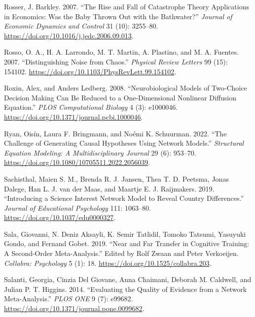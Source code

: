 \documentclass[
  a4paper,
  DIV=11,
  numbers=noendperiod]{scrreprt}
\newlength{\cslhangindent}
\newlength{\cslentryspacingunit} %
\newenvironment{CSLReferences}[2] %
 {%
  \setlength{\parindent}{0pt}
  \ifodd #1
  \let\oldpar\par
  \def\par{\hangindent=\cslhangindent\oldpar}
  \fi
  \setlength{\parskip}{#2\cslentryspacingunit}
 }%
 {}
\begin{document}
\begin{CSLReferences}{1}{0}
\leavevmode{}%
Rosser, J. Barkley. 2007. {``The Rise and Fall of Catastrophe Theory
Applications in Economics: {Was} the Baby Thrown Out with the
Bathwater?''} \emph{Journal of Economic Dynamics and Control} 31 (10):
3255--80. \url{https://doi.org/10.1016/j.jedc.2006.09.013}.

\leavevmode{}%
Rosso, O. A., H. A. Larrondo, M. T. Martin, A. Plastino, and M. A.
Fuentes. 2007. {``Distinguishing Noise from Chaos.''} \emph{Physical
Review Letters} 99 (15): 154102.
\url{https://doi.org/10.1103/PhysRevLett.99.154102}.

\leavevmode{}%
Roxin, Alex, and Anders Ledberg. 2008. {``Neurobiological {Models} of
{Two-Choice Decision Making Can Be Reduced} to a {One-Dimensional
Nonlinear Diffusion Equation}.''} \emph{PLOS Computational Biology} 4
(3): e1000046. \url{https://doi.org/10.1371/journal.pcbi.1000046}.

\leavevmode{}%
Ryan, Oisín, Laura F. Bringmann, and Noémi K. Schuurman. 2022. {``The
{Challenge} of {Generating Causal Hypotheses Using Network Models}.''}
\emph{Structural Equation Modeling: A Multidisciplinary Journal} 29 (6):
953--70. \url{https://doi.org/10.1080/10705511.2022.2056039}.

\leavevmode{}%
Sachisthal, Maien S. M., Brenda R. J. Jansen, Thea T. D. Peetsma, Jonas
Dalege, Han L. J. van der Maas, and Maartje E. J. Raijmakers. 2019.
{``Introducing a Science Interest Network Model to Reveal Country
Differences.''} \emph{Journal of Educational Psychology} 111: 1063--80.
\url{https://doi.org/10.1037/edu0000327}.

\leavevmode{}%
Sala, Giovanni, N. Deniz Aksayli, K. Semir Tatlidil, Tomoko Tatsumi,
Yasuyuki Gondo, and Fernand Gobet. 2019. {``Near and {Far Transfer} in
{Cognitive Training}: {A Second-Order Meta-Analysis}.''} Edited by Rolf
Zwaan and Peter Verkoeijen. \emph{Collabra: Psychology} 5 (1): 18.
\url{https://doi.org/10.1525/collabra.203}.

\leavevmode{}%
Salanti, Georgia, Cinzia Del Giovane, Anna Chaimani, Deborah M.
Caldwell, and Julian P. T. Higgins. 2014. {``Evaluating the Quality of
Evidence from a Network Meta-Analysis.''} \emph{PLOS ONE} 9 (7): e99682.
\url{https://doi.org/10.1371/journal.pone.0099682}.


\end{CSLReferences}
\end{document}
